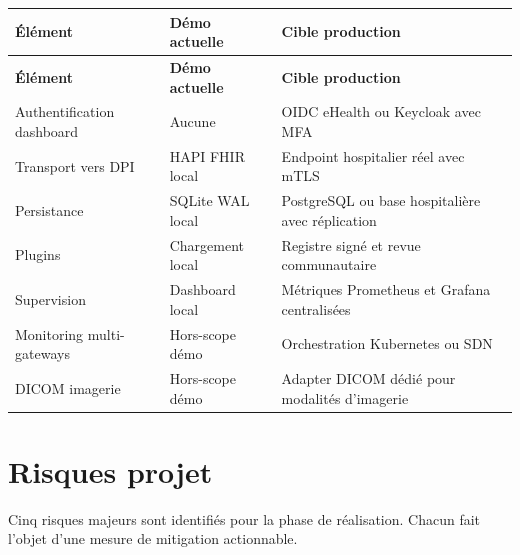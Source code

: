 \bridgezebra
\begin{longtable}{p{4.5cm}p{4.5cm}p{5.5cm}}
  \toprule
  \rowcolor{bridgeblue!90}
  {\color{white}\bfseries Élément} & {\color{white}\bfseries Démo actuelle} & {\color{white}\bfseries Cible production} \\
  \midrule
  \endfirsthead
  \toprule
  \rowcolor{bridgeblue!90}
  {\color{white}\bfseries Élément} & {\color{white}\bfseries Démo actuelle} & {\color{white}\bfseries Cible production} \\
  \midrule
  \endhead
  \bottomrule
  \endfoot
  Authentification dashboard & Aucune & OIDC eHealth ou Keycloak avec MFA \\
  Transport vers DPI & HAPI FHIR local & Endpoint hospitalier réel avec mTLS \\
  Persistance & SQLite WAL local & PostgreSQL ou base hospitalière avec réplication \\
  Plugins & Chargement local & Registre signé et revue communautaire \\
  Supervision & Dashboard local & Métriques Prometheus et Grafana centralisées \\
  Monitoring multi-gateways & Hors-scope démo & Orchestration Kubernetes ou SDN \\
  DICOM imagerie & Hors-scope démo & Adapter DICOM dédié pour modalités d'imagerie \\
\end{longtable}

\section{Risques projet}
\label{sec:risques-projet}

Cinq risques majeurs sont identifiés pour la phase de réalisation. Chacun fait l'objet d'une mesure de mitigation actionnable.

